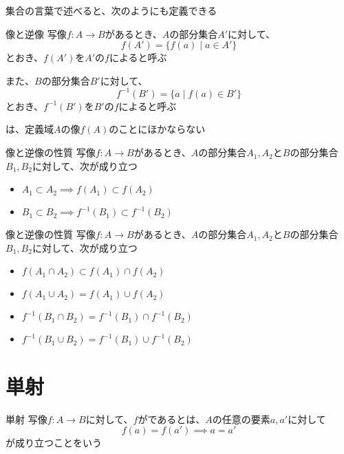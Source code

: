 \documentclass[b5paper,12pt,notitlepage]{jsreport}
\begin{document}
集合の言葉で述べると、次のようにも定義できる

\begin{definition}{像と逆像}
  写像$f\colon A \to B$があるとき、$A$の部分集合$A'$に対して、
  \begin{equation*}
    f(A') = \{ f(a) \mid a \in A' \}
  \end{equation*}
  とおき、$f(A')$を$A'$の$f$によると呼ぶ

  また、$B$の部分集合$B'$に対して、
  \begin{equation*}
    f^{-1}(B') = \{ a \mid f(a) \in B' \}
  \end{equation*}
  とおき、$f^{-1}(B')$を$B'$の$f$によると呼ぶ
\end{definition}

は、定義域$A$の像$f(A)$のことにほかならない

\begin{theorem}{像と逆像の性質}
  写像$f\colon A \to B$があるとき、$A$の部分集合$A_1, A_2$と$B$の部分集合$B_1, B_2$に対して、次が成り立つ
  \begin{itemize}
    \item $A_1 \subset A_2 \implies f(A_1) \subset f(A_2)$
    \item $B_1 \subset B_2 \implies f^{-1}(B_1) \subset f^{-1}(B_2)$
  \end{itemize}
\end{theorem}

\begin{theorem}{像と逆像の性質}
  写像$f\colon A \to B$があるとき、$A$の部分集合$A_1, A_2$と$B$の部分集合$B_1, B_2$に対して、次が成り立つ
  \begin{itemize}
    \item $f(A_1 \cap A_2) \subset f(A_1) \cap f(A_2)$
    \item $f(A_1 \cup A_2) = f(A_1) \cup f(A_2)$
    \item $f^{-1}(B_1 \cap B_2) = f^{-1}(B_1) \cap f^{-1}(B_2)$
    \item $f^{-1}(B_1 \cup B_2) = f^{-1}(B_1) \cup f^{-1}(B_2)$
  \end{itemize}
\end{theorem}

\sectionline
\section{単射}

\begin{definition}{単射}
  写像$f\colon A \to B$に対して、$f$がであるとは、$A$の任意の要素$a, a'$に対して
  \begin{equation*}
    f(a) = f(a') \implies a = a'
  \end{equation*}
  が成り立つことをいう
\end{definition}
\end{document}
